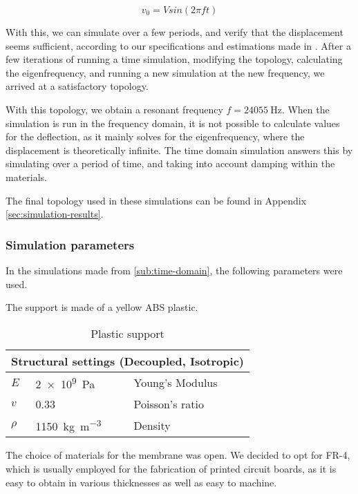 \begin{equation}
  v_0 = V sin(2\pi f t)
  \label{eq:v0}
\end{equation}

With this, we can simulate over a few periods, and verify that the displacement
seems sufficient, according to our specifications and estimations made in
. After a few iterations of running a time simulation,
modifying the topology, calculating the eigenfrequency, and running a new
simulation at the new frequency, we arrived at a satisfactory topology.


With this topology, we obtain a resonant frequency $f = \SI{24055}{\hertz}$.
When the simulation is run in the frequency domain, it is not possible to
calculate values for the deflection, as it mainly solves for the eigenfrequency,
where the displacement is theoretically infinite. The time domain simulation
answers this by simulating over a period of time, and taking into account
damping within the materials.

The final topology used in these simulations can be found in Appendix
\ref{sec:simulation-results}.

\subsubsection{Simulation parameters}
In the simulations made from \ref{sub:time-domain}, the following parameters
were used.

The support is made of a yellow ABS plastic.

\begin{table}[!h]
  \centering
  \begin{tabular}{l|l|l}
    \multicolumn{3}{l}{Structural settings (Decoupled, Isotropic)}	\\
    \hline
    $E$		& \SI{2e9}{\pascal} 	& Young's Modulus 	\\
    $v$		& \SI{0.33}{}		& Poisson's ratio	\\
    $\rho$	& \SI{1150}{\kilo\gram\per\cubic\metre}	& Density	\\
  \end{tabular}
  \caption{Plastic support}
  \label{tab:properties-plastic}
\end{table}

The choice of materials for the membrane was open. We decided to opt for FR-4,
which is usually employed for the fabrication of printed circuit boards, as it
is easy to obtain in various thicknesses as well as easy to machine.


